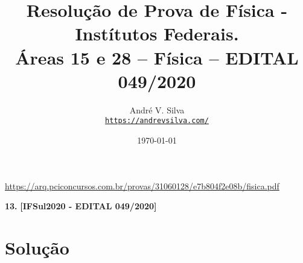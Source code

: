 \documentclass[a4paper,12pt]{article}
\title{Resolu\c{c}\~ao de Prova de F\'isica - Inst\'itutos Federais.\\
Áreas 15 e 28 – Física – EDITAL 049/2020}
\author{Andr\'e V. Silva \\
\href{https://andrevsilva.com/}{\texttt{https://andrevsilva.com/}}}
\date{\today}
\newcommand{\printingbibliography}{%

    \pagestyle{myheadings}
    \markright{}
    \sloppy
    \printbibliography[heading=bibintoc, %
                   title=Refer\^encias %
                  ]
    \fussy%
}
\begin{document}
\maketitle

\begin{center}
\url{https://arq.pciconcursos.com.br/provas/31060128/e7b804f2e08b/fisica.pdf}
\end{center}

\textbf{13.} \textbf{[IFSul2020 - EDITAL 049/2020]} 

\section*{Solução}


\end{document}
